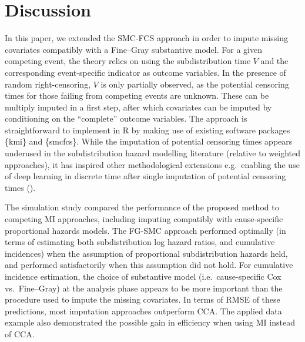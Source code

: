 \documentclass[
  letterpaper,
  paper=240mm:170mm,
  twoside=true,
  open=right,
  fontsize=10pt,
  pagesize=false,
  BCOR=15mm,
  DIV=14,
  headinclude=true,
  footinclude=false,
  headsepline=on]{scrbook}
\begin{document}
\section{Discussion}\label{sec-discussion}

In this paper, we extended the SMC-FCS approach in order to impute
missing covariates compatibly with a Fine--Gray substantive model. For a
given competing event, the theory relies on using the subdistribution
time \(V\) and the corresponding event-specific indicator as outcome
variables. In the presence of random right-censoring, \(V\) is only
partially observed, as the potential censoring times for those failing
from competing events are unknown. These can be multiply imputed in a
first step, after which covariates can be imputed by conditioning on the
``complete'' outcome variables. The approach is straightforward to
implement in R by making use of existing software packages \{kmi\} and
\{smcfcs\}. While the imputation of potential censoring times appears
underused in the subdistribution hazard modelling literature (relative
to weighted approaches), it has inspired other methodological extensions
e.g.~enabling the use of deep learning in discrete time after single
imputation of potential censoring times
().

The simulation study compared the performance of the proposed method to
competing MI approaches, including imputing compatibly with
cause-specific proportional hazards models. The FG-SMC approach
performed optimally (in terms of estimating both subdistribution log
hazard ratios, and cumulative incidences) when the assumption of
proportional subdistribution hazards held, and performed satisfactorily
when this assumption did not hold. For cumulative incidence estimation,
the choice of substantive model (i.e.~cause-specific Cox vs.~Fine--Gray)
at the analysis phase appears to be more important than the procedure
used to impute the missing covariates. In terms of RMSE of these
predictions, most imputation approaches outperform CCA. The applied data
example also demonstrated the possible gain in efficiency when using MI
instead of CCA.
\end{document}
